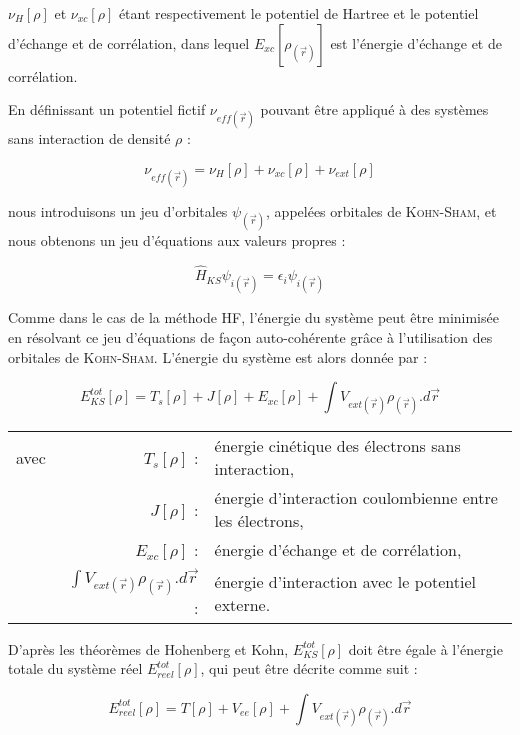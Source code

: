 \documentclass[12pt,a4paper]{book}
\begin{document}
	\noindent $\nu_{H}[\rho]$ et $\nu_{xc}[\rho]$ étant respectivement le potentiel de Hartree et le potentiel d'échange et de corrélation, dans lequel $E_{xc}[\rho_{(\vec{r})}]$ est l'énergie d'échange et de corrélation.
	
	En définissant un potentiel fictif $\nu_{eff(\vec{r})}$ pouvant être appliqué à des systèmes sans interaction de densité $\rho$ :
	
	\begin{equation}
	\nu_{eff(\vec{r})} = \nu_{H}[\rho] + \nu_{xc}[\rho] + \nu_{ext}[\rho]
	\end{equation}
	
	\noindent nous introduisons un jeu d'orbitales $\psi_{(\vec{r})}$, appelées orbitales de \textsc{Kohn-Sham}, et nous obtenons un jeu d'équations aux valeurs propres :
	
	\begin{equation}
	\hat{H}_{KS} \psi_{i(\vec{r})} = \epsilon_{i} \psi_{i(\vec{r})}
	\end{equation}
	
	Comme dans le cas de la méthode HF, l'énergie du système peut être minimisée en résolvant ce jeu d'équations de façon auto-cohérente grâce à l'utilisation des orbitales de \textsc{Kohn-Sham}. L'énergie du système est alors donnée par :
	
	\begin{equation}
	E_{KS}^{tot}[\rho] = T_{s}[\rho] + J[\rho] + E_{xc}[\rho] + \int V_{ext(\vec{r})}\rho_{(\vec{r})} .d\vec{r}
	\end{equation}
	
	\begin{flushleft}
		\begin{tabular}{@{}lrp{10cm}}
			avec & $T_{s}[\rho]$ : & énergie cinétique des électrons sans interaction, \\
			& $J[\rho]$ : & énergie d'interaction coulombienne entre les électrons, \\
			& $E_{xc}[\rho]$ : & énergie d'échange et de corrélation, \\
			& $\int V_{ext(\vec{r})}\rho_{(\vec{r})} .d\vec{r}$ : & énergie d'interaction avec le potentiel externe. 
		\end{tabular}
	\end{flushleft}
	
	D'après les théorèmes de Hohenberg et Kohn, $E_{KS}^{tot}[\rho]$ doit être égale à l'énergie totale du système réel $E_{reel}^{tot}[\rho]$, qui peut être décrite comme suit :
	
	\begin{equation}
	E_{reel}^{tot}[\rho] = T[\rho] + V_{ee}[\rho] + \int V_{ext(\vec{r})}\rho_{(\vec{r})} .d\vec{r}
	\end{equation}
	
\end{document}
